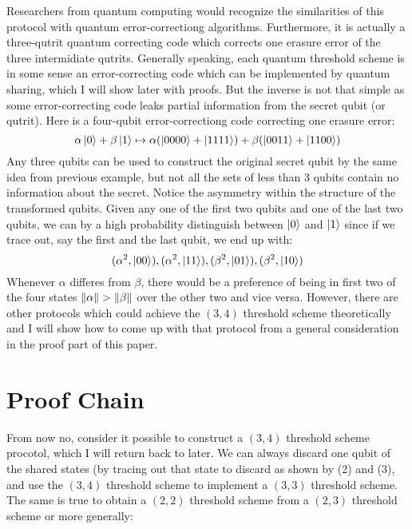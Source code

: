 \documentclass[12pt]{article}
\begin{document}
Researchers from quantum computing would recognize the similarities of this protocol with quantum error-correctiong algorithms. Furthermore, it is actually a three-qutrit quantum correcting code which corrects one erasure error of the three intermidiate qutrits. Generally speaking, each quantum threshold scheme is in some sense an error-correcting code which can be implemented by quantum sharing, which I will show later with proofs. But the inverse is not that simple as some error-correcting code leaks partial information from the secret qubit (or qutrit). Here is a four-qubit error-correctiong code correcting one erasure error:
\begin{equation*}
	\alpha \ket{0} + \beta \ket{1} \mapsto \alpha ( \ket{0000} + \ket{1111}) + \beta ( \ket{0011} + \ket{1100})
\end{equation*}
Any three qubits can be used to construct the original secret qubit by the same idea from previous example, but not all the sets of less than $3$ qubits contain no information about the secret. Notice the asymmetry within the structure of the transformed qubits. Given any one of the first two qubits and one of the last two qubits, we can by a high probability distinguish between $\ket{0}$ and $\ket{1}$ since if we trace out, say the first and the last qubit, we end up with:
\begin{equation}
	( \alpha ^2, \ket{00}), ( \alpha ^2, \ket{11}), ( \beta ^2, \ket{01}), ( \beta ^2, \ket{10})
\end{equation}
Whenever $ \alpha $ differes from $ \beta $, there would be a preference of being in first two of the four states $ \norm{\alpha} > \norm{\beta} $ over the other two and vice versa.
However, there are other protocols which could achieve the $(3,4)$ threshold scheme theoretically and I will show how to come up with that protocol from a general consideration in the proof part of this paper.\\
\section{Proof Chain}
From now no, consider it possible to construct a $(3, 4)$ threshold scheme procotol, which I will return back to later. We can always discard one qubit of the shared states (by tracing out that state to discard as shown by (2) and (3), and use the $(3,4)$ threshold scheme to implement a $(3, 3)$ threshold scheme. The same is true to obtain a $(2,2)$ threshold scheme from a $(2, 3)$ threshold scheme or more generally:
\end{document}

